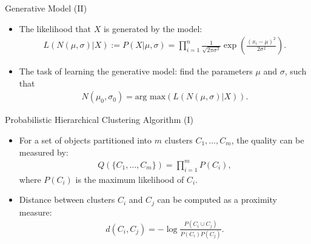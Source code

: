 \begin{frame}{Generative Model (II)}
	\centering
	\begin{itemize}
		\item The likelihood that $X$ is generated by the model:
		      \begin{align*}
			      L(N(\mu,\sigma) \vert X) := P(X \vert \mu, \sigma) =
			      \prod_{i=1}^{n} \frac{1}{\sqrt{2\pi\sigma^2}} \exp\left(
			      \frac{(x_i-\mu)^2}{2\sigma^2}\right).
		      \end{align*}
		\item The task of learning the generative model: find the parameters
		      $\mu$ and $\sigma$, such that
		      \begin{align*}
			      N(\mu_0,\sigma_0) = \text{arg max}\left( L(N(\mu,\sigma)\vert X)
			      \right).
		      \end{align*}
	\end{itemize}
\end{frame}

\begin{frame}{Probabilistic Hierarchical Clustering Algorithm (I)}
	\centering
	\begin{itemize}
		\item For a set of objects partitioned into $m$ clusters $C_1, \ldots,
			      C_m$,
		      the quality can be measured by:
		      \begin{align*}
			      Q(\{C_1, \ldots, C_m\}) = \prod_{i=1}^{m} P(C_i),
		      \end{align*}
		      where $P(C_i)$ is the maximum likelihood of $C_i$.
		\item Distance between clusters $C_i$ and $C_j$ can be computed as a
		      proximity measure:
		      \begin{align*}
			      d(C_i,C_j) = - \log \frac{P(C_i \cup C_j)}{P(C_i)P(C_j)}.
		      \end{align*}
	\end{itemize}
\end{frame}

